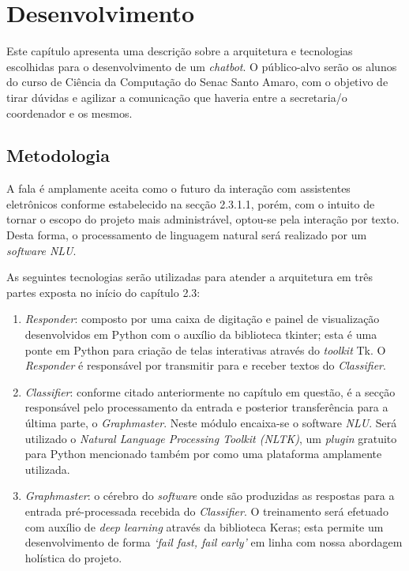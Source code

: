 \documentclass[
	12pt,				%
	oneside,
	a4paper,			%
	english,			%
	french,				%
	spanish,			%
	brazil				%
	]{abntex2}
\begin{document}

\chapter{Desenvolvimento}

Este capítulo apresenta uma descrição sobre a arquitetura e tecnologias escolhidas para o desenvolvimento de um \emph{chatbot}. O público-alvo serão os alunos do curso de Ciência da Computação do Senac Santo Amaro, com o objetivo de tirar dúvidas e agilizar a comunicação que haveria entre a secretaria/o coordenador e os mesmos.


\section{Metodologia}

A fala é amplamente aceita como o futuro da interação com assistentes eletrônicos conforme estabelecido na secção 2.3.1.1, porém, com o intuito de tornar o escopo do projeto mais administrável, optou-se pela interação por texto. Desta forma, o processamento de linguagem natural será realizado por um \emph{software NLU}.

As seguintes tecnologias serão utilizadas para atender a arquitetura em três partes exposta no início do capítulo 2.3:

\begin{enumerate}
\item \emph{Responder}: composto por uma caixa de digitação e painel de visualização desenvolvidos em Python com o auxílio da biblioteca tkinter; esta é uma ponte em Python para criação de telas interativas através do \emph{toolkit} Tk. O \emph{Responder} é responsável por transmitir para e receber textos do \emph{Classifier}.
\item \emph{Classifier}: conforme citado anteriormente no capítulo em questão, é a secção responsável pelo processamento da entrada e posterior transferência para a última parte, o \emph{Graphmaster}. Neste módulo encaixa-se o software \emph{NLU}. Será utilizado o \emph{Natural Language Processing Toolkit (NLTK)}, um \emph{plugin} gratuito para Python mencionado também por \textcite{Abdul-Kader2015} como uma plataforma amplamente utilizada.
\item \emph{Graphmaster}: o cérebro do \emph{software} onde são produzidas as respostas para a entrada pré-processada recebida do \emph{Classifier}. O treinamento será efetuado com auxílio de \emph{deep learning} através da biblioteca Keras; esta permite um desenvolvimento de forma \emph{‘fail fast, fail early’} em linha com nossa abordagem holística do projeto.
\end{enumerate}
\end{document}
